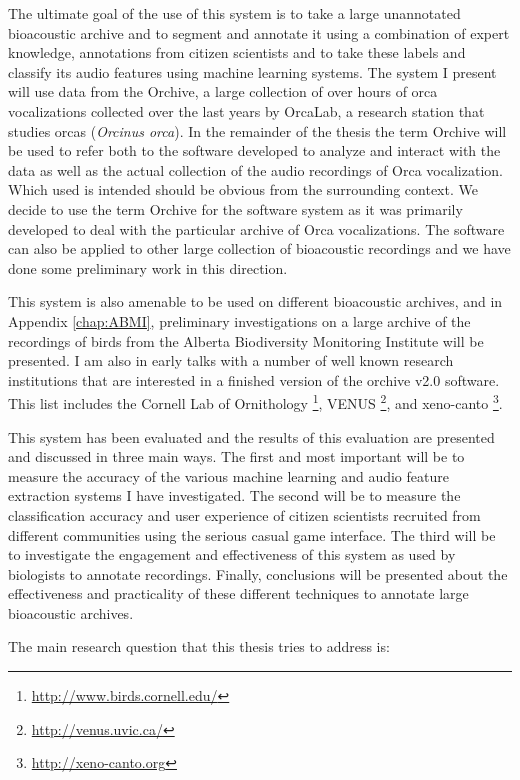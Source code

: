 The ultimate goal of the use of this system is to take a large
unannotated bioacoustic archive and to segment and annotate it using a
combination of expert knowledge, annotations from citizen scientists
and to take these labels and classify its audio features using machine
learning systems.  The system I present will use data from the
Orchive, a large collection of over \aboutNumberOfOrchiveRecordings
hours of orca vocalizations collected over the last
\totalYearsOrcaLabCollecting years by OrcaLab, a research station that
studies orcas (\textit{Orcinus orca}).  In the remainder of the thesis
the term Orchive will be used to refer both to the software developed
to analyze and interact with the data as well as the actual collection
of the audio recordings of Orca vocalization. Which used is intended
should be obvious from the surrounding context. We decide to use the
term Orchive for the software system as it was primarily developed to
deal with the particular archive of Orca vocalizations. The software
can also be applied to other large collection of bioacoustic
recordings and we have done some preliminary work in this direction.

This system is also amenable to be used on different bioacoustic
archives, and in Appendix \ref{chap:ABMI}, preliminary investigations
on a large archive of the recordings of birds from the Alberta
Biodiversity Monitoring Institute will be presented.  I am also in
early talks with a number of well known research institutions that are
interested in a finished version of the orchive v2.0 software.  This
list includes the Cornell Lab of
Ornithology \footnote{\url{http://www.birds.cornell.edu/}},
VENUS \footnote{\url{http://venus.uvic.ca/}}, and
xeno-canto \footnote{\url{http://xeno-canto.org}}.

This system has been evaluated and the results of this evaluation are
presented and discussed in three main ways.  The first and most
important will be to measure the accuracy of the various machine
learning and audio feature extraction systems I have investigated.
The second will be to measure the classification accuracy and user
experience of citizen scientists recruited from different communities
using the serious casual game interface.  The third will be to
investigate the engagement and effectiveness of this system as used by
biologists to annotate recordings.  Finally, conclusions will be
presented about the effectiveness and practicality of these different
techniques to annotate large bioacoustic archives.


The main research question that this thesis tries to address is:

